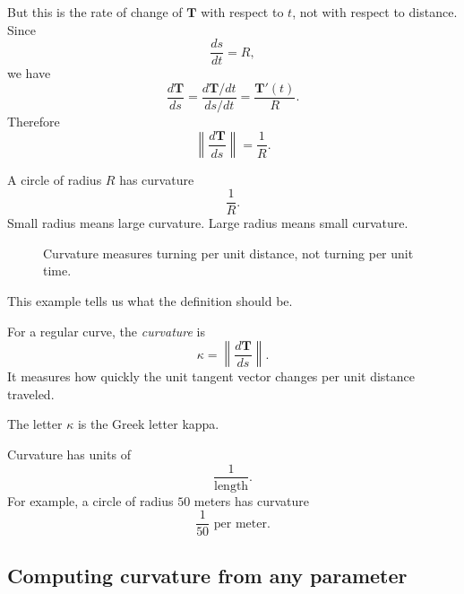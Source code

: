 But this is the rate of change of \(\mathbf T\) with respect to \(t\), not with respect to
distance.  Since
\[
    \frac{ds}{dt}=R,
\]
we have
\[
    \frac{d\mathbf T}{ds}
    =
    \frac{d\mathbf T/dt}{ds/dt}
    =
    \frac{\mathbf T'(t)}{R}.
\]
Therefore
\[
    \left\|\frac{d\mathbf T}{ds}\right\|
    =
    \frac1R.
\]

A circle of radius \(R\) has curvature
\[
    \frac1R.
\]
Small radius means large curvature.  Large radius means small curvature.

\begin{figure}[h]
\centering
{}
\caption{Curvature measures turning per unit distance, not turning per unit time.}
\end{figure}

This example tells us what the definition should be.

\begin{definition}[Curvature]
For a regular curve, the \emph{curvature} is
\[
\boxed{
    \kappa=\left\|\frac{d\mathbf T}{ds}\right\|.
}
\]
It measures how quickly the unit tangent vector changes per unit distance traveled.
\end{definition}

The letter \(\kappa\) is the Greek letter kappa.

Curvature has units of
\[
    \frac{1}{\text{length}}.
\]
For example, a circle of radius \(50\) meters has curvature
\[
    \frac{1}{50}\text{ per meter}.
\]

\subsection{Computing curvature from any parameter}

